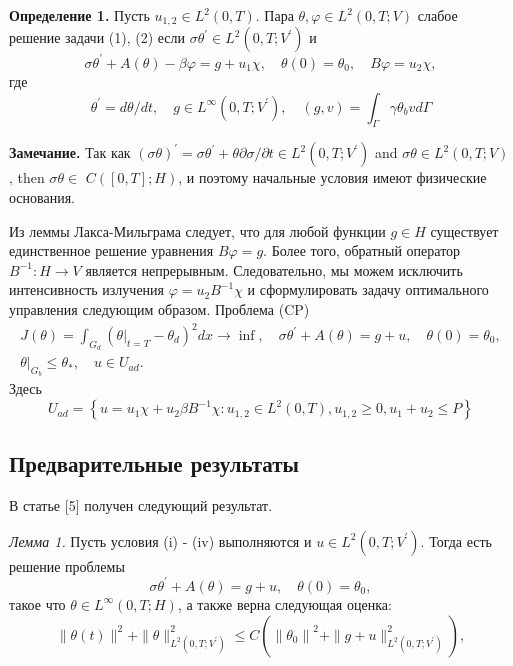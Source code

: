 \textbf{Определение 1.} Пусть $u_{1,2} \in L^{2}(0, T)$.
Пара $\theta, \varphi \in L^{2}(0, T ; V)$ слабое решение задачи (1), (2) если
$\sigma \theta^{\prime} \in L^{2}\left(0, T ; V^{\prime}\right)$ и
\[
    \sigma \theta^{\prime}+A(\theta)-\beta \varphi=g+u_{1} \chi,
    \quad \theta(0)=\theta_{0}, \quad B \varphi=u_{2} \chi,
\]
где
\[
    \theta^{\prime}=d \theta / d t, \quad g \in L^{\infty}\left(0, T ; V^{\prime}\right),
    \quad(g, v)=\int_{\Gamma} \gamma \theta_{b} v d \Gamma
\]

\textbf{Замечание.} Так как $(\sigma \theta)^{\prime}=\sigma \theta^{\prime}+\theta
\partial \sigma / \partial t \in L^{2}\left(0, T ; V^{\prime}\right)$ and $\sigma
\theta \in L^{2}(0, T ; V)$, then $\sigma \theta \in$ $C([0, T] ; H)$,
и поэтому начальные условия имеют физические основания.

Из леммы Лакса-Мильграма следует, что для любой функции $g \in H$ существует единственное
решение уравнения $B\varphi= g$.
Более того, обратный оператор $B ^{-1}: H \rightarrow V$ является непрерывным.
Следовательно, мы можем исключить интенсивность излучения $\varphi=u_{2} B ^ {-1} \chi$
и сформулировать задачу оптимального управления следующим образом.
Проблема (CP)
\[
    \begin{gathered}
        J(\theta)=\int_{G_{d}}\left(\left.\theta\right|_{t=T}
        - \theta_{d}\right)^{2} d x \rightarrow \inf,
        \quad \sigma \theta^{\prime}+A(\theta)=g+u, \quad \theta(0)=\theta_{0}, \\
        \left.\theta\right|_{G_{b}} \leq \theta_{*}, \quad u \in U_{a d}.
    \end{gathered}
\]
Здесь
\[
    U_{a d}=\left\{u=u_{1} \chi+u_{2} \beta B^{-1} \chi: u_{1,2} \in L^{2}(0, T), u_{1,2}
    \geq 0, u_{1}+u_{2} \leq P\right\}
\]

\subsection{Предварительные результаты}\label{subsec:ch3:sec3:subsec3}
В статье [5] получен следующий результат.

\textit{Лемма 1.}
Пусть условия (i) - (iv) выполняются и $u \in L^{2}\left(0, T ; V^{\prime}\right)$.
Тогда есть решение проблемы
\[
    \sigma \theta^{\prime}+A(\theta)=g+u, \quad \theta(0)=\theta_{0},
\]
такое что $\theta \in L^{\infty}(0, T ; H)$, а также верна следующая оценка:
\[
    \|\theta(t)\|^{2}+\|\theta\|_{L^{2}\left(0, T ; V^{\prime}\right)}^{2}
    \leq C\left(\left\|\theta_{0}\right\|^{2}+\|g+u\|_{L^{2}
    \left(0, T; V^{\prime}\right)}^{2}\right),
\]

